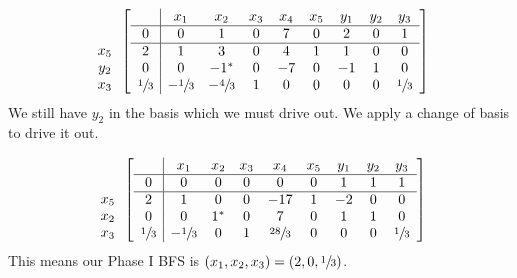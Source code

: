 \documentclass[12pt]{article}
\newenvironment{problem}[2][Problem]{\begin{trivlist}
\item[\hskip \labelsep {\bfseries #1}\hskip \labelsep {\bfseries #2.}]}{\end{trivlist}}
\theoremstyle{definition}
\begin{document}
\begin{problem}{4}
\begin{equation}
\begin{array}{c}
\\
  \\
x_5 \\
y_2 \\
x_3
\end{array}
\begin{bmatrix}
\begin{array}{c|cccccccc}
    & x_1 & x_2 & x_3 & x_4 & x_5 & y_1 & y_2 & y_3 \\ \hline
  0 & 0 & 1 & 0 & 7 & 0 & 2 & 0 & 1 \\ \hline
  2 & 1 & 3 & 0 & 4 & 1 & 1 & 0 & 0  \\
  0 & 0 & -1^* & 0 & -7 & 0 & -1 & 1 & 0  \\
  \sfrac{1}{3} & -\sfrac{1}{3} & -\sfrac{4}{3} & 1 & 0 & 0 & 0 & 0 & \sfrac{1}{3}  \\
\end{array}
\end{bmatrix}
\end{equation}
$ $ \\

We still have $y_2$ in the basis which we must drive out.
We apply a change of basis to drive it out.

\begin{equation}
\begin{array}{c}
\\
  \\
x_5 \\
x_2 \\
x_3
\end{array}
\begin{bmatrix}
\begin{array}{c|cccccccc}
    & x_1 & x_2 & x_3 & x_4 & x_5 & y_1 & y_2 & y_3 \\ \hline
  0 & 0 & 0 & 0 & 0 & 0 & 1 & 1 & 1 \\ \hline
  2 & 1 & 0 & 0 & -17 & 1 & -2 & 0 & 0  \\
  0 & 0 & 1^* & 0 & 7 & 0 & 1 & 1 & 0  \\
  \sfrac{1}{3} & -\sfrac{1}{3} & 0 & 1 & \sfrac{28}{3} & 0 & 0 & 0 & \sfrac{1}{3}  \\
\end{array}
\end{bmatrix}
\end{equation}
$ $ \\

This means our Phase I BFS is $(x_1, x_2, x_3) = (2, 0, \sfrac{1}{3})$.
\end{problem}
\end{document}
